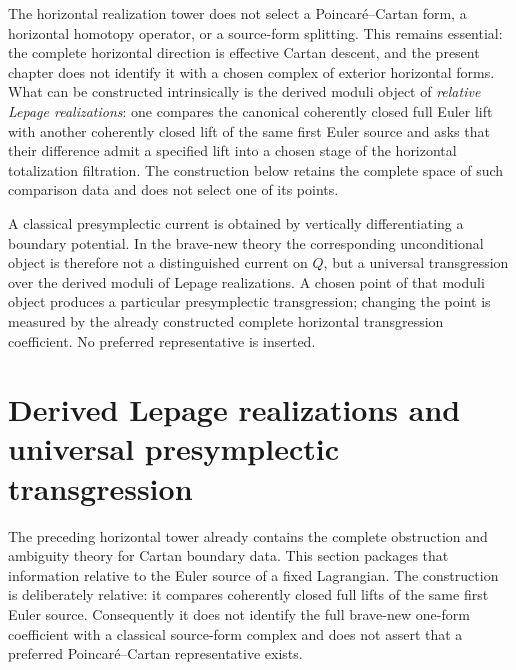 \begin{remark}
\label{rem:var-no-canonical-lepage}
The horizontal realization tower does not select a Poincar\'e--Cartan form, a horizontal homotopy operator, or a source-form splitting.  This remains essential: the complete horizontal direction is effective Cartan descent, and the present chapter does not identify it with a chosen complex of exterior horizontal forms.  What can be constructed intrinsically is the derived moduli object of \emph{relative Lepage realizations}: one compares the canonical coherently closed full Euler lift with another coherently closed lift of the same first Euler source and asks that their difference admit a specified lift into a chosen stage of the horizontal totalization filtration.  The construction below retains the complete space of such comparison data and does not select one of its points.
\end{remark}

\begin{remark}
\label{rem:var-presymplectic-interface}
A classical presymplectic current is obtained by vertically differentiating a boundary potential.  In the brave-new theory the corresponding unconditional object is therefore not a distinguished current on \(Q\), but a universal transgression over the derived moduli of Lepage realizations.  A chosen point of that moduli object produces a particular presymplectic transgression; changing the point is measured by the already constructed complete horizontal transgression coefficient.  No preferred representative is inserted.
\end{remark}

\section{Derived Lepage realizations and universal presymplectic transgression}
\label{sec:var-lepage-presymplectic}

The preceding horizontal tower already contains the complete obstruction and ambiguity theory for Cartan boundary data.  This section packages that information relative to the Euler source of a fixed Lagrangian.  The construction is deliberately relative: it compares coherently closed full lifts of the same first Euler source.  Consequently it does not identify the full brave-new one-form coefficient with a classical source-form complex and does not assert that a preferred Poincar\'e--Cartan representative exists.

